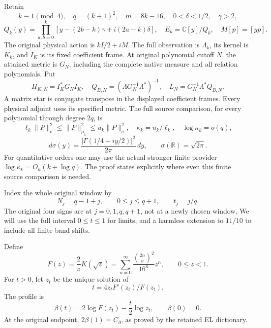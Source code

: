 \documentclass[10pt]{article}
\begin{document}
Retain \[
 k\equiv1\pmod4,\quad q=(k+1)^2,\quad m=8k-16,
 \quad 0<\delta<1/2,\quad\gamma>2,
\] \[
 Q_k(y)=\prod_{a,b=0}^k
 [y-(2b-k)\gamma+i(2a-k)\delta],
 \quad E_k=\mathbb C[y]/Q_k,\quad M[p]=[yp].
 \tag{CU1}
\] The original physical action is \(kI/2+iM\). The full observation is \(\Lambda_k\), its kernel is \(K_k\), and \(I_K\) is its fixed coefficient frame. At original polynomial cutoff \(N\), the attained metric is \(G_N\), including the complete native measure and all relation polynomials. Put \[
 H_{K,N}=I_K^*G_NI_K,\quad
 Q_{B,N}=(\Lambda G_N^{-1}\Lambda^*)^{-1},\quad
 L_N=G_N^{-1}\Lambda^*Q_{B,N}.
\] A matrix star is conjugate transpose in the displayed coefficient frames. Every physical adjoint uses its specified metric. The full source comparison, for every polynomial through degree \(2q\), is \[
 \ell_k\|P\|_\sigma^2\le\|P\|_{\mu_k}^2\le u_k\|P\|_\sigma^2,
 \quad \kappa_k=u_k/\ell_k,\quad \log\kappa_k=o(q),
\] \[
 d\sigma(y)=\frac{|\Gamma(1/4+iy/2)|^2}{2\pi}\,dy,
 \qquad \sigma(\mathbb R)=\sqrt{2\pi}.
 \tag{CU2}
\] For quantitative orders one may use the actual stronger finite provider \(\log\kappa_k=O_h(k+\log q)\). The proof states explicitly where even this finite source comparison is needed.

Index the whole original window by \[
 N_j=q-1+j,\qquad 0\le j\le q+1,\qquad t_j=j/q.
 \tag{CU3}
\] The original four signs are at \(j=0,1,q,q+1\), not at a newly chosen window. We will use the full interval \(0\le t\le1\) for limits, and a harmless extension to \(11/10\) to include all finite band shifts.

Define \[
 F(z)=\frac2\pi K(\sqrt z)
 =\sum_{n=0}^{\infty}\frac{\binom{2n}{n}^2}{16^n}z^n,
 \qquad 0\le z<1.
\] For \(t>0\), let \(z_t\) be the unique solution of \[
 t=4z_tF'(z_t)/F(z_t).
\] The profile is \[
 \boxed{\beta(t)=2\log F(z_t)-\frac t2\log z_t,\qquad\beta(0)=0.}
 \tag{CU4}
\] At the original endpoint, \(2\beta(1)=C_\partial\), as proved by the retained EL dictionary.
\end{document}
